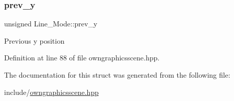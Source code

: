 \subsubsection{\texorpdfstring{prev\+\_\+y}{prev\_y}}
{\footnotesize\ttfamily unsigned Line\+\_\+\+Mode\+::prev\+\_\+y}

Previous y position 

Definition at line 88 of file owngraphicsscene.\+hpp.



The documentation for this struct was generated from the following file\+:\begin{DoxyCompactItemize}
\item 
include/\mbox{\hyperlink{owngraphicsscene_8hpp}{owngraphicsscene.\+hpp}}\end{DoxyCompactItemize}
